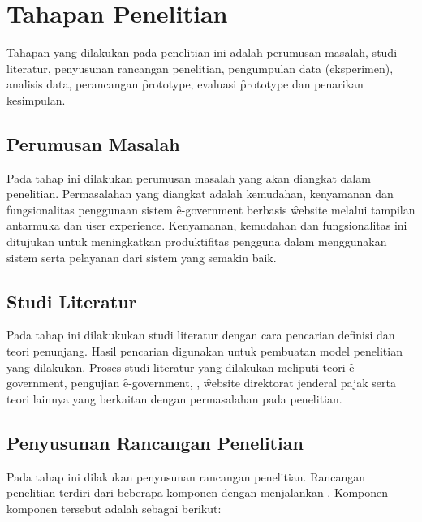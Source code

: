 \section{Tahapan Penelitian}
Tahapan yang dilakukan pada penelitian ini adalah perumusan masalah, studi literatur, penyusunan rancangan penelitian, pengumpulan data (eksperimen), analisis data, perancangan \f{prototype}, evaluasi \f{prototype} dan penarikan kesimpulan.
\subsection{Perumusan Masalah}
Pada tahap ini dilakukan perumusan masalah yang akan diangkat dalam penelitian. Permasalahan yang diangkat adalah kemudahan, kenyamanan dan fungsionalitas penggunaan sistem \f{e-government} berbasis \f{website} melalui tampilan antarmuka dan \f{user experience}. Kenyamanan, kemudahan dan fungsionalitas ini ditujukan untuk meningkatkan produktifitas pengguna dalam menggunakan sistem serta pelayanan dari sistem yang semakin baik.
\subsection{Studi Literatur}
Pada tahap ini dilakukukan studi literatur dengan cara pencarian definisi dan teori penunjang. Hasil pencarian digunakan untuk pembuatan model penelitian yang dilakukan. Proses studi literatur yang dilakukan meliputi teori \f{e-government}, pengujian \f{e-government}, \ust, \f{website} direktorat jenderal pajak serta teori lainnya yang berkaitan dengan permasalahan pada penelitian.
\subsection{Penyusunan Rancangan Penelitian}
Pada tahap ini dilakukan penyusunan rancangan penelitian. Rancangan penelitian terdiri dari beberapa komponen dengan menjalankan \ust. Komponen-komponen tersebut adalah sebagai berikut:
